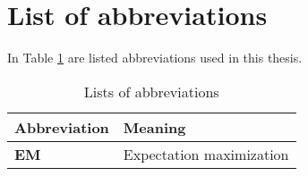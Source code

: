 \section{List of abbreviations}\label{ape:abbreviations}

In Table \ref{table:abbreviations} are listed abbreviations used in this thesis.

\begin{table}[!htb]
\centering
\begin{tabular}{ll}
\textbf{Abbreviation} & \textbf{Meaning} \\
\hline
\textbf{EM} & Expectation maximization \\
\end{tabular}
\caption{Lists of abbreviations}
\label{table:abbreviations}
\end{table}